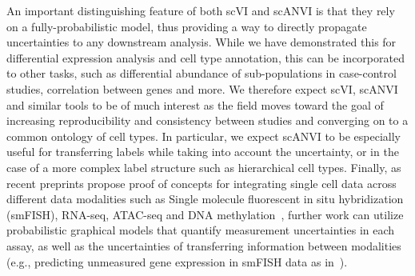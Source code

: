 An important distinguishing feature of both scVI and scANVI is that they rely on a fully-probabilistic model, thus providing a way to directly propagate uncertainties to any downstream analysis. While we have demonstrated this for differential expression analysis and cell type annotation, this can be incorporated to other tasks, such as differential abundance of sub-populations in case-control studies, correlation between genes and more. We therefore expect scVI, scANVI and similar tools to be of much interest as the field moves toward the goal of increasing reproducibility and consistency between studies and converging on to a common ontology of cell types. In particular, we expect scANVI to be especially useful for transferring labels while taking into account the uncertainty, or in the case of a more complex label structure such as hierarchical cell types. Finally, as recent preprints propose proof of concepts for integrating single cell data across different data modalities such as Single molecule fluorescent in situ hybridization (smFISH), RNA-seq, ATAC-seq and DNA methylation~\cite{LIGER, SEURAT3}, further work can utilize probabilistic graphical models that quantify measurement uncertainties in each assay, as well as the uncertainties of transferring information between modalities (e.g., predicting unmeasured gene expression in smFISH data as in~\cite{DBLP:journals/corr/abs-1905-02269}).



